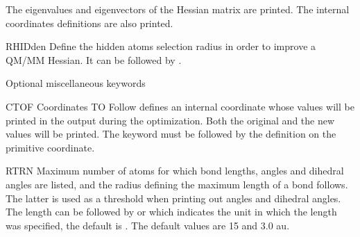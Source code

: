 \begin{keywordlist}
The eigenvalues and eigenvectors of the Hessian matrix
are printed. The internal coordinates definitions are also printed.
\item[RHIDden]
Define the hidden atoms selection radius in order to improve a QM/MM Hessian. It can be followed by .
\end{keywordlist}

Optional miscellaneous keywords

\begin{keywordlist}
\item[CTOF]
Coordinates TO Follow defines an internal coordinate whose values
will be printed in the output during the optimization. Both
the original and the new values will be printed.
The keyword must be followed by the definition on the primitive
coordinate.
\item[RTRN]
Maximum number of atoms for which bond lengths, angles and dihedral
angles are listed, and
the radius defining the maximum length of a bond follows.
The latter is used as a threshold when printing out
angles and dihedral angles. The length can be followed by
 or
 which indicates the unit in which the length
was specified, the default is
.
The default values are 15 and 3.0 au.

\end{keywordlist}
